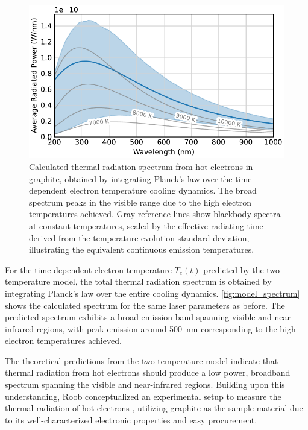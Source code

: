 \documentclass[
	parskip=half,
	a4paper,
]{scrarticle}
\begin{document}
\begin{figure}[b]
    \centering
    \includegraphics{../analysis/figures/model spectrum.pdf}
    \caption{Calculated thermal radiation spectrum from hot electrons in graphite, obtained by integrating Planck's law over the time-dependent electron temperature cooling dynamics. The broad spectrum peaks in the visible range due to the high electron temperatures achieved. Gray reference lines show blackbody spectra at constant temperatures, scaled by the effective radiating time derived from the temperature evolution standard deviation, illustrating the equivalent continuous emission temperatures.}
    \label{fig:model_spectrum}
\end{figure}
For the time-dependent electron temperature $T_e(t)$ predicted by the two-temperature model, the total thermal radiation spectrum is obtained by integrating Planck's law over the entire cooling dynamics. \autoref{fig:model_spectrum} shows the calculated spectrum for the same laser parameters as before. The predicted spectrum exhibits a broad emission band spanning visible and near-infrared regions, with peak emission around \SI{500}{nm} corresponding to the high electron temperatures achieved.

The theoretical predictions from the two-temperature model indicate that thermal radiation from hot electrons should produce a low power, broadband spectrum spanning the visible and near-infrared regions. Building upon this understanding, Roob conceptualized an experimental setup to measure the thermal radiation of hot electrons \cite{roob_thermal_2025}, utilizing graphite as the sample material due to its well-characterized electronic properties \cite{nihira_temperature_2003} and easy procurement.
\end{document}
